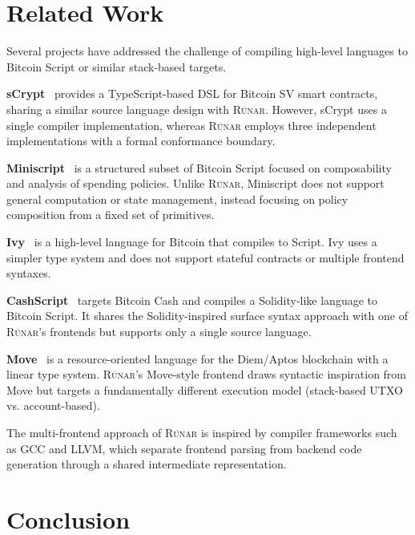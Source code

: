 \documentclass[11pt,a4paper]{article}
\newcommand{\runar}{\textsc{Rúnar}}
\begin{document}
\section{Related Work}
\label{sec:related}

Several projects have addressed the challenge of compiling high-level
languages to Bitcoin Script or similar stack-based targets.

\textbf{sCrypt}~\cite{scrypt} provides a TypeScript-based DSL for Bitcoin SV
smart contracts, sharing a similar source language design with \runar{}.
However, sCrypt uses a single compiler implementation, whereas \runar{}
employs three independent implementations with a formal conformance boundary.

\textbf{Miniscript}~\cite{miniscript} is a structured subset of Bitcoin
Script focused on composability and analysis of spending policies. Unlike
\runar{}, Miniscript does not support general computation or state management,
instead focusing on policy composition from a fixed set of primitives.

\textbf{Ivy}~\cite{ivy} is a high-level language for Bitcoin that compiles
to Script. Ivy uses a simpler type system and does not support stateful
contracts or multiple frontend syntaxes.

\textbf{CashScript}~\cite{cashscript} targets Bitcoin Cash and compiles
a Solidity-like language to Bitcoin Script. It shares the Solidity-inspired
surface syntax approach with one of \runar{}'s frontends but supports only a
single source language.

\textbf{Move}~\cite{move} is a resource-oriented language for the Diem/Aptos
blockchain with a linear type system. \runar{}'s Move-style frontend draws
syntactic inspiration from Move but targets a fundamentally different
execution model (stack-based UTXO vs. account-based).

The multi-frontend approach of \runar{} is inspired by compiler frameworks
such as GCC and LLVM, which separate frontend parsing from backend code
generation through a shared intermediate representation.

\section{Conclusion}
\label{sec:conclusion}
\end{document}
